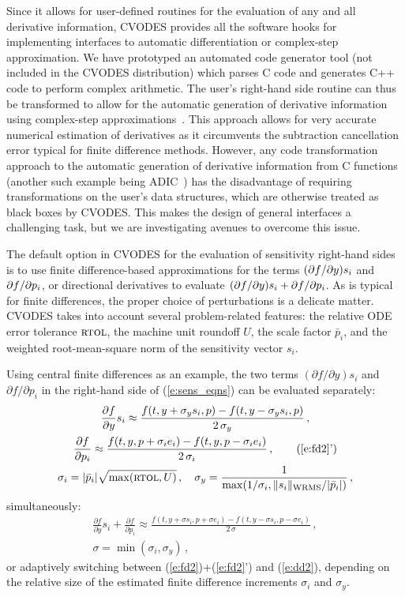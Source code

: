 Since it allows for user-defined routines for the evaluation of any and all 
derivative information, CVODES provides all the software hooks for implementing 
interfaces to automatic differentiation or complex-step approximation. 
We have prototyped an automated code generator tool (not included in the
CVODES distribution) which parses C code and generates C++ code to perform
complex arithmetic. The user's right-hand side routine can thus be transformed
to allow for the automatic generation of derivative information using 
complex-step approximations~\cite{MSA:03}. This approach allows for very accurate numerical
estimation of derivatives as it circumvents the subtraction cancellation error 
typical for finite difference methods. However, any code transformation approach
to the automatic generation of derivative information from C functions 
(another such example being ADIC~\cite{BRM:97}) has the disadvantage 
of requiring transformations on the user's data structures, which are otherwise 
treated as black boxes by CVODES. 
This makes the design of general interfaces a challenging task, but we 
are investigating avenues to overcome this issue.

The default option in CVODES for the evaluation of sensitivity right-hand 
sides is to use finite difference-based approximations for the terms $(\partial f / \partial y) s_i$ 
and $\partial f / \partial p_i$, or directional derivatives to evaluate
$(\partial f / \partial y) s_i + \partial f / \partial p_i$.
As is typical for finite differences, the proper choice of perturbations is a 
delicate matter. CVODES takes into account several problem-related features:
the relative ODE error tolerance $\mbox{\sc rtol}$, the machine unit roundoff $U$,
the scale factor ${\bar p}_i$, and the weighted root-mean-square norm of the 
sensitivity vector $s_i$.

Using central finite differences as an example, the two terms 
$({\partial f}/{\partial y}) s_i$ 
and ${\partial f}/{\partial p_i}$ in the right-hand side of (\ref{e:sens_eqns}) 
can be evaluated separately:
\begin{gather}
  \frac{\partial f}{\partial y} s_i \approx \frac{f(t, y+\sigma_y s_i, p)-
    f(t, y-\sigma_y s_i, p)}{2\,\sigma_y} \, , \label{e:fd2} \\
  \frac{\partial f}{\partial p_i} \approx \frac{f(t,y,p + \sigma_i e_i)-
    f(t,y,p - \sigma_i e_i)}{2\,\sigma_i} \, , \tag{\ref{e:fd2}'} \\
  \sigma_i = |{\bar p}_i| \sqrt{\max( \mbox{\sc rtol} , U)} \, , \quad
  \sigma_y = \frac{1}{\max(1/\sigma_i, \|s_i\|_{\mbox{\scriptsize WRMS}}/|{\bar p}_i|)} \, , \nonumber
\end{gather}
simultaneously:
\begin{gather}
  \frac{\partial f}{\partial y} s_i + \frac{\partial f}{\partial p_i} \approx
  \frac{f(t, y+\sigma s_i, p + \sigma e_i) -
    f(t, y-\sigma s_i, p - \sigma e_i)}{2\,\sigma} \, , \label{e:dd2} \\
  \sigma = \min(\sigma_i, \sigma_y) \, , \nonumber
\end{gather}
or adaptively switching between (\ref{e:fd2})+(\ref{e:fd2}') and (\ref{e:dd2}), 
depending on the relative size of the estimated finite difference 
increments $\sigma_i$ and $\sigma_y$.

